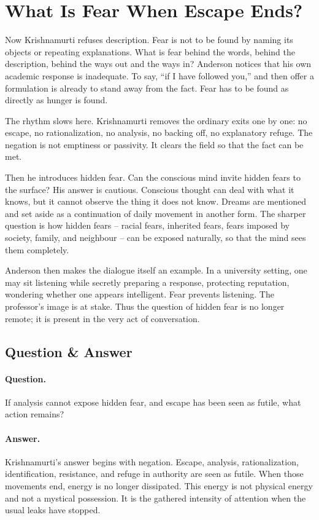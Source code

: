 \section{What Is Fear When Escape Ends?}

Now Krishnamurti refuses description. Fear is not to be found by naming its objects or repeating explanations. What is fear behind the words, behind the description, behind the ways out and the ways in? Anderson notices that his own academic response is inadequate. To say, ``if I have followed you,'' and then offer a formulation is already to stand away from the fact. Fear has to be found as directly as hunger is found.

The rhythm slows here. Krishnamurti removes the ordinary exits one by one: no escape, no rationalization, no analysis, no backing off, no explanatory refuge. The negation is not emptiness or passivity. It clears the field so that the fact can be met.

Then he introduces hidden fear. Can the conscious mind invite hidden fears to the surface? His answer is cautious. Conscious thought can deal with what it knows, but it cannot observe the thing it does not know. Dreams are mentioned and set aside as a continuation of daily movement in another form. The sharper question is how hidden fears -- racial fears, inherited fears, fears imposed by society, family, and neighbour -- can be exposed naturally, so that the mind sees them completely.

Anderson then makes the dialogue itself an example. In a university setting, one may sit listening while secretly preparing a response, protecting reputation, wondering whether one appears intelligent. Fear prevents listening. The professor's image is at stake. Thus the question of hidden fear is no longer remote; it is present in the very act of conversation.

\subsection{Question \& Answer}

\paragraph{Question.}
If analysis cannot expose hidden fear, and escape has been seen as futile, what action remains?

\paragraph{Answer.}
Krishnamurti's answer begins with negation. Escape, analysis, rationalization, identification, resistance, and refuge in authority are seen as futile. When those movements end, energy is no longer dissipated. This energy is not physical energy and not a mystical possession. It is the gathered intensity of attention when the usual leaks have stopped.

